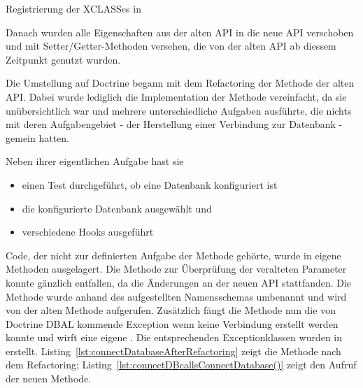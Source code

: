 \begin{listing}[H]
\caption{Registrierung der XCLASSes in }
\label{lst:xclassDatabaseAPI}
\end{listing}

Danach wurden alle Eigenschaften aus der alten API in die neue API verschoben und mit Setter/Getter-Methoden versehen, die von der alten API ab diessem Zeitpunkt genutzt wurden.

Die Umstellung auf Doctrine begann mit dem Refactoring der Methode  der alten API. Dabei wurde lediglich die Implementation der Methode vereinfacht, da sie unübersichtlich war und mehrere unterschiedliche Aufgaben ausführte, die nichts mit deren Aufgabengebiet - der Herstellung einer Verbindung zur Datenbank - gemein hatten.

Neben ihrer eigentlichen Aufgabe hast sie

\begin{itemize}
	\item einen Test durchgeführt, ob eine Datenbank konfiguriert ist
	\item die konfigurierte Datenbank ausgewählt und
	\item verschiedene Hooks ausgeführt
\end{itemize}

Code, der nicht zur definierten Aufgabe der Methode gehörte, wurde in eigene Methoden ausgelagert. Die Methode zur Überprüfung der veralteten Parameter konnte gänzlich entfallen, da die Änderungen an der neuen API stattfanden. Die Methode wurde anhand des aufgestellten Namensschemas umbenannt und wird von der alten Methode aufgerufen. Zusätzlich fängt die Methode nun die von Doctrine DBAL kommende Exception wenn keine Verbindung erstellt werden konnte und wirft eine eigene . Die entsprechenden Exceptionklassen wurden in\\  erstellt. Listing~\ref{lst:connectDatabaseAfterRefactoring} zeigt die Methode nach dem Refactoring; Listing~\ref{lst:connectDBcallsConnectDatabase()} zeigt den Aufruf der neuen Methode.

